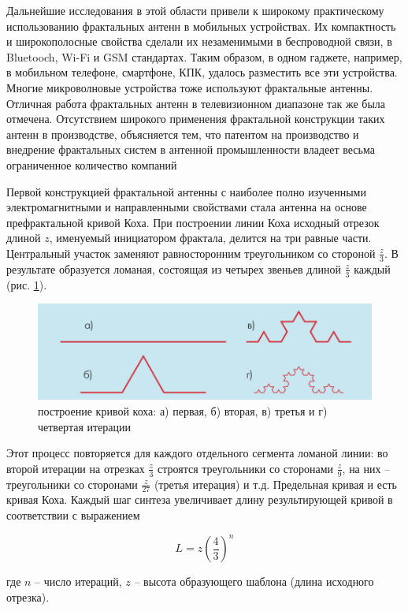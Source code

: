 Дальнейшие исследования в этой области привели к широкому практическому использованию фрактальных антенн в мобильных устройствах. Их компактность и широкополосные свойства сделали их незаменимыми в беспроводной связи, в Bluetooch, Wi-Fi и GSM стандартах. Таким образом, в одном гаджете, например, в мобильном телефоне, смартфоне, КПК, удалось разместить все эти устройства. Многие микроволновые устройства тоже используют фрактальные антенны. Отличная работа фрактальных антенн в телевизионном диапазоне так же была отмечена. Отсутствием широкого применения фрактальной конструкции таких антенн в производстве, объясняется тем, что патентом на производство и внедрение фрактальных систем в антенной промышленности владеет весьма  ограниченное количество компаний

Первой конструкцией фрактальной антенны с наиболее
полно изученными электромагнитными и направленными
свойствами стала антенна на основе префрактальной кривой
Коха. При построении линии Коха исходный отрезок длиной
$z$, именуемый инициатором фрактала, делится на три равные
части. Центральный участок заменяют равносторонним треугольником со стороной $\frac{z}{3}$. В результате образуется ломаная,
состоящая из четырех звеньев длиной $\frac{z}{3}$ каждый (рис. \ref{fig:koch}).

\begin{figure}[H]
    \centering
    \includegraphics[width=.9\textwidth]{img/koch.png}
    \caption{построение кривой коха: а) первая, б) вторая, в) третья и г) четвертая итерации}
    \label{fig:koch}
\end{figure}

Этот процесс повторяется для каждого отдельного сегмента
ломаной линии: во второй итерации на отрезках $\frac{z}{3}$ строятся треугольники со сторонами $\frac{z}{9}$, на них – треугольники со
сторонами $\frac{z}{27}$ (третья итерация) и т.д. Предельная кривая и 
есть кривая Коха. Каждый шаг синтеза увеличивает длину результирующей кривой в соответствии с выражением


\[
    L = z  \left( \frac{4}{3}\right)^n
\]

где $n$ – число итераций, $z$ – высота образующего шаблона (длина исходного отрезка).

